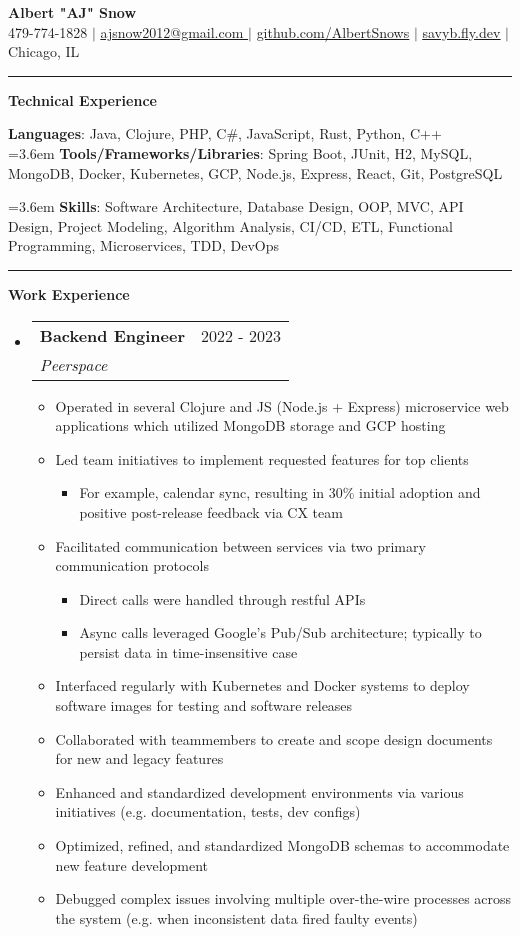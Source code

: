 \documentclass[letterpaper,11pt]{article}
\makeatletter
\newcommand{\resumeItem}[1]{
  \item\small{
    {#1 \vspace{-2pt}}
  }
}
\newcommand{\resumeSubheading}[4]{
  \vspace{-2pt}\item
    \begin{tabular*}{0.97\textwidth}[t]{l@{\extracolsep{\fill}}r}
      \textbf{#1} & #2 \\
      \textit{\small#3} & \textit{\small #4} \\
    \end{tabular*}\vspace{0pt}
}
\newcommand{\resumeSubHeadingListStart}{\begin{itemize}[leftmargin=0.15cm, label={}]}
\newcommand{\resumeSubHeadingListEnd}{\end{itemize}}
\newcommand{\resumeItemListStart}{\begin{itemize}}
\newcommand{\resumeItemListEnd}{\end{itemize}\vspace{-5pt}}
\makeatother
\begin{document}
\textbf{\normalshape \Large \textcolor{magic_blue}{Albert "AJ" Snow}} \\ \vspace{3pt}
\small 479-774-1828 $|$ \href{ mailto:ajsnow2012@gmail.com }
{\underline{ ajsnow2012@gmail.com }} $|$
\href{https://github.com/AlbertSnows}{\underline{github.com/AlbertSnows}}
$|$ \href{https://savyb.fly.dev/}{\underline{savyb.fly.dev}}
$|$ Chicago, IL
\noindent\rule{19.5cm}{0.4pt}

\textbf{\large \textcolor{magic_blue}{Technical Experience} }

\begin{onehalfspace}
    \textbf{ Languages}{: Java, Clojure, PHP, C\#, JavaScript, Rust, Python, C++ } \\
		\hangindent=3.6em
    \textbf{ Tools/Frameworks/Libraries}{: 
		Spring Boot, JUnit, H2, MySQL, 
		MongoDB, Docker, Kubernetes, GCP, Node.js, 
		Express, React, Git, PostgreSQL } \\
\end{onehalfspace}
\hangindent=3.6em
\textbf{ Skills}{: }
Software Architecture, Database Design, OOP, MVC, 
API Design, Project Modeling, Algorithm Analysis, CI/CD,
ETL, Functional Programming, Microservices, TDD, DevOps
\noindent\rule{19.5cm}{0.4pt}

\textbf{\large \textcolor{magic_blue}{Work Experience}}
\resumeSubHeadingListStart
\resumeSubheading
{Backend Engineer}{2022 - 2023}
{Peerspace}{}
\resumeItemListStart
\resumeItem{ Operated in several Clojure and JS (Node.js + Express) microservice web applications which utilized MongoDB storage and GCP hosting}
\resumeItem{ Led team initiatives to implement requested features for top clients }
\begin{itemize}
	\item For example, calendar sync, resulting in 30\% initial adoption and positive post-release feedback via CX team
\end{itemize}
\resumeItem{Facilitated communication between services via two primary communication protocols}
\begin{itemize}
	\item Direct calls were handled through restful APIs
	\item Async calls leveraged Google's Pub/Sub architecture; typically to persist data in time-insensitive case
\end{itemize}
\resumeItem{Interfaced regularly with Kubernetes and Docker systems to deploy software images for testing and software releases}
\resumeItem{Collaborated with teammembers to create and scope design documents for new and legacy features}
\resumeItem{Enhanced and standardized development environments via various initiatives (e.g. documentation, tests, dev configs)}
\resumeItem{Optimized, refined, and standardized MongoDB schemas to accommodate new feature development}
\resumeItem{Debugged complex issues involving multiple over-the-wire processes across the system (e.g. when inconsistent data fired faulty events) }
\resumeItemListEnd
\resumeSubHeadingListEnd
\end{document}
